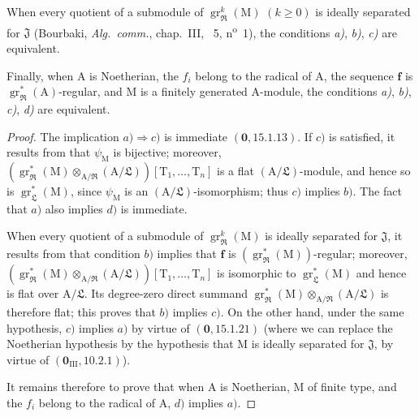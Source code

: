 \begin{theorem}[19.7.1]
When every quotient of a submodule of $\operatorname{gr}_\mathfrak{R}^k(\mathrm{M})$ $(k\geqslant 0)$ is ideally separated for $\mathfrak{J}$ (Bourbaki, \emph{Alg.~comm.}, chap.~III, \textsection~5, n\textsuperscript{o}~1), the conditions \emph{a)}, \emph{b)}, \emph{c)} are equivalent.

Finally, when $\mathrm{A}$ is Noetherian, the $f_i$ belong to the radical of $\mathrm{A}$, the sequence $\mathbf{f}$ is $\operatorname{gr}_\mathfrak{R}^*(\mathrm{A})$-regular, and $\mathrm{M}$ is a finitely generated $\mathrm{A}$-module, the conditions \emph{a)}, \emph{b)}, \emph{c)}, \emph{d)} are equivalent.
\end{theorem}

\begin{proof}
The implication $a)\Rightarrow c)$ is immediate $(\mathbf{0},15.1.13)$. If $c)$ is satisfied, it results from  that $\psi_\mathrm{M}$ is bijective; moreover, $(\operatorname{gr}_\mathfrak{R}^*(\mathrm{M})\otimes_{\mathrm{A}/\mathfrak{R}}(\mathrm{A}/\mathfrak{L}))[\mathrm{T}_1,\ldots,\mathrm{T}_n]$ is a flat $(\mathrm{A}/\mathfrak{L})$-module, and hence so is $\operatorname{gr}_\mathfrak{L}^*(\mathrm{M})$, since $\psi_\mathrm{M}$ is an $(\mathrm{A}/\mathfrak{L})$-isomorphism; thus $c)$ implies $b)$. The fact that $a)$ also implies $d)$ is immediate.

When every quotient of a submodule of $\operatorname{gr}_\mathfrak{R}^k(\mathrm{M})$ is ideally separated for $\mathfrak{J}$, it results from  that condition $b)$ implies that $\mathbf{f}$ is $(\operatorname{gr}_\mathfrak{R}^*(\mathrm{M}))$-regular; moreover, $(\operatorname{gr}_\mathfrak{R}^*(\mathrm{M})\otimes_{\mathrm{A}/\mathfrak{R}}(\mathrm{A}/\mathfrak{L}))[\mathrm{T}_1,\ldots,\mathrm{T}_n]$ is isomorphic to $\operatorname{gr}_\mathfrak{L}^*(\mathrm{M})$ and hence is flat over $\mathrm{A}/\mathfrak{L}$. Its degree-zero direct summand $\operatorname{gr}_\mathfrak{R}^*(\mathrm{M})\otimes_{\mathrm{A}/\mathfrak{R}}(\mathrm{A}/\mathfrak{L})$ is therefore flat; this proves that $b)$ implies $c)$. On the other hand, under the same hypothesis, $c)$ implies $a)$ by virtue of $(\mathbf{0},15.1.21)$ (where we can replace the Noetherian hypothesis by the hypothesis that $\mathrm{M}$ is ideally separated for $\mathfrak{J}$, by virtue of $(\mathbf{0}_\mathrm{III},10.2.1)$).

It remains therefore to prove that when $\mathrm{A}$ is Noetherian, $\mathrm{M}$ of finite type, and the $f_i$ belong to the radical of $\mathrm{A}$, $d)$ implies $a)$.


\end{proof}
